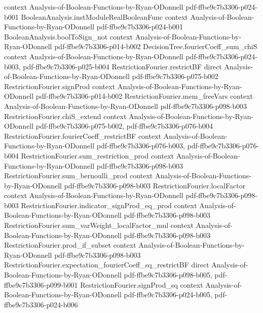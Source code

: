 \begin{lemma}
  {context}
  {Analysis-of-Boolean-Functions-by-Ryan-ODonnell}
  {pdf-ffbe9c7b3306-p024-b001}
\proofstep
  {BooleanAnalysis.instModuleRealBooleanFunc}
  {context}
  {Analysis-of-Boolean-Functions-by-Ryan-ODonnell}
  {pdf-ffbe9c7b3306-p024-b001}
\proofstep
  {BooleanAnalysis.boolToSign_not}
  {context}
  {Analysis-of-Boolean-Functions-by-Ryan-ODonnell}
  {pdf-ffbe9c7b3306-p014-b002}
\proofstep
  {DecisionTree.fourierCoeff_sum_chiS}
  {context}
  {Analysis-of-Boolean-Functions-by-Ryan-ODonnell}
  {pdf-ffbe9c7b3306-p024-b003,
    pdf-ffbe9c7b3306-p025-b004}
\proofstep
  {RestrictionFourier.restrictBF}
  {direct}
  {Analysis-of-Boolean-Functions-by-Ryan-ODonnell}
  {pdf-ffbe9c7b3306-p075-b002}
\proofstep
  {RestrictionFourier.signProd}
  {context}
  {Analysis-of-Boolean-Functions-by-Ryan-ODonnell}
  {pdf-ffbe9c7b3306-p014-b002}
\proofstep
  {RestrictionFourier.mem_freeVars}
  {context}
  {Analysis-of-Boolean-Functions-by-Ryan-ODonnell}
  {pdf-ffbe9c7b3306-p098-b003}
\proofstep
  {RestrictionFourier.chiS_extend}
  {context}
  {Analysis-of-Boolean-Functions-by-Ryan-ODonnell}
  {pdf-ffbe9c7b3306-p075-b002,
    pdf-ffbe9c7b3306-p076-b004}
\proofstep
  {RestrictionFourier.fourierCoeff_restrictBF}
  {context}
  {Analysis-of-Boolean-Functions-by-Ryan-ODonnell}
  {pdf-ffbe9c7b3306-p076-b003,
    pdf-ffbe9c7b3306-p076-b004}
\proofstep
  {RestrictionFourier.sum_restriction_prod}
  {context}
  {Analysis-of-Boolean-Functions-by-Ryan-ODonnell}
  {pdf-ffbe9c7b3306-p098-b003}
\proofstep
  {RestrictionFourier.sum_bernoulli_prod}
  {context}
  {Analysis-of-Boolean-Functions-by-Ryan-ODonnell}
  {pdf-ffbe9c7b3306-p098-b003}
\proofstep
  {RestrictionFourier.localFactor}
  {context}
  {Analysis-of-Boolean-Functions-by-Ryan-ODonnell}
  {pdf-ffbe9c7b3306-p098-b003}
\proofstep
  {RestrictionFourier.indicator_signProd_eq_prod}
  {context}
  {Analysis-of-Boolean-Functions-by-Ryan-ODonnell}
  {pdf-ffbe9c7b3306-p098-b003}
\proofstep
  {RestrictionFourier.sum_varWeight_localFactor_mul}
  {context}
  {Analysis-of-Boolean-Functions-by-Ryan-ODonnell}
  {pdf-ffbe9c7b3306-p098-b003}
\proofstep
  {RestrictionFourier.prod_if_subset}
  {context}
  {Analysis-of-Boolean-Functions-by-Ryan-ODonnell}
  {pdf-ffbe9c7b3306-p098-b003}
\proofstep
  {RestrictionFourier.expectation_fourierCoeff_sq_restrictBF}
  {direct}
  {Analysis-of-Boolean-Functions-by-Ryan-ODonnell}
  {pdf-ffbe9c7b3306-p098-b005,
    pdf-ffbe9c7b3306-p099-b001}
\proofstep
  {RestrictionFourier.signProd_sq}
  {context}
  {Analysis-of-Boolean-Functions-by-Ryan-ODonnell}
  {pdf-ffbe9c7b3306-p024-b005,
    pdf-ffbe9c7b3306-p024-b006}
\proofstep

\end{lemma}
